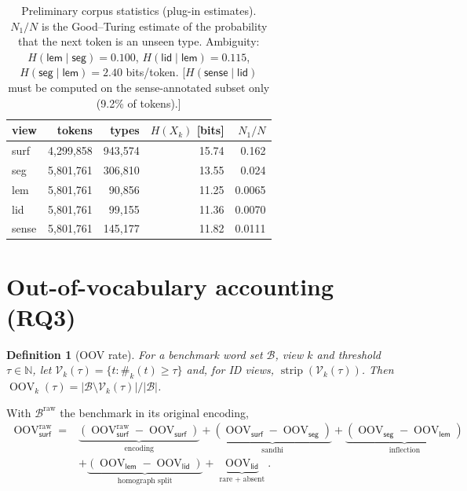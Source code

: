 \documentclass[11pt,a4paper]{article}
\newtheorem{definition}{Definition}
\theoremstyle{remark}\newtheorem{remark}{Remark}
\newcommand{\Voc}{\mathcal{V}}          %
\newcommand{\B}{\mathcal{B}}            %
\newcommand{\cnt}{\#}                   %
\newcommand{\OOV}{\operatorname{OOV}}
\newcommand{\strip}{\operatorname{strip}}
\newcommand{\vk}[1]{\textsf{#1}}         %
\newcommand{\todo}[1]{\textcolor{red!70!black}{[#1]}}
\begin{document}
\begin{table}[h]\centering\small
\begin{tabular}{lrrrr}
\toprule
view & tokens & types & $H(X_k)$ [bits] & $N_1/N$ \\
\midrule
\vk{surf}  & 4,299,858 & 943,574 & 15.74 & 0.162\\
\vk{seg}   & 5,801,761 & 306,810 & 13.55 & 0.024\\
\vk{lem}   & 5,801,761 &  90,856 & 11.25 & 0.0065\\
\vk{lid}   & 5,801,761 &  99,155 & 11.36 & 0.0070\\
\vk{sense} & 5,801,761 & 145,177 & 11.82 & 0.0111\\
\bottomrule
\end{tabular}
\caption{Preliminary corpus statistics (plug-in estimates). $N_1/N$ is the
Good--Turing estimate of the probability that the next token is an unseen
type. Ambiguity: $H(\vk{lem}\mid\vk{seg})=0.100$,
$H(\vk{lid}\mid\vk{lem})=0.115$, $H(\vk{seg}\mid\vk{lem})=2.40$ bits/token.
\todo{$H(\vk{sense}\mid\vk{lid})$ must be computed on the sense-annotated
subset only (9.2\% of tokens).}}
\label{tab:corpus}
\end{table}

\section{Out-of-vocabulary accounting (RQ3)}
\begin{definition}[OOV rate]\label{def:oov}
For a benchmark word set $\B$, view $k$ and threshold $\tau\in\mathbb{N}$, let
$\Voc_k(\tau) = \{t : \cnt_k(t)\ge\tau\}$ and, for ID views,
$\strip(\Voc_k(\tau))$. Then
$\OOV_k(\tau) = |\B\setminus\Voc_k(\tau)|/|\B|$.
\end{definition}

\noindent With $\B^{\mathrm{raw}}$ the benchmark in its original encoding,
\begin{align*}
\OOV^{\mathrm{raw}}_{\vk{surf}} ={}&
\underbrace{(\OOV^{\mathrm{raw}}_{\vk{surf}}-\OOV_{\vk{surf}})}_{\text{encoding}}
+\underbrace{(\OOV_{\vk{surf}}-\OOV_{\vk{seg}})}_{\text{sandhi}}
+\underbrace{(\OOV_{\vk{seg}}-\OOV_{\vk{lem}})}_{\text{inflection}}\\
&+\underbrace{(\OOV_{\vk{lem}}-\OOV_{\vk{lid}})}_{\text{homograph split}}
+\underbrace{\OOV_{\vk{lid}}}_{\text{rare}\;+\;\text{absent}}.
\end{align*}
\end{document}
